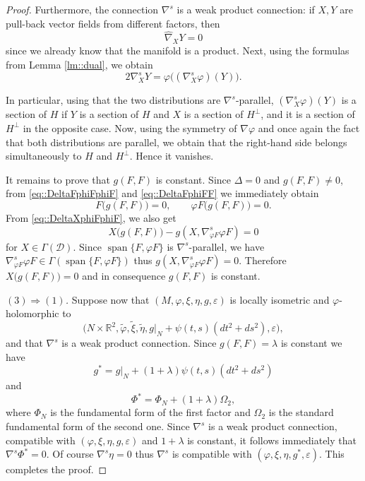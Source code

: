 \documentclass[12pt,a4paper,final]{amsart}
\numberwithin{equation}{section}
\theoremstyle{df}
\newcommand{\R}{\mathbb{R}}
\newcommand{\Span}{\operatorname{span}}
\newcommand{\eps}{\varepsilon}
\begin{document}
\begin{proof}
\par

 Furthermore,  the connection $\nabla^s$ is a weak product
connection: if $X,Y$ are pull-back vector fields  from different
factors, then
\[
\widehat{\nabla}_XY=0
\]
since we already know that the manifold is a product.
Next, using the formulas from Lemma \ref{lm::dual}, we obtain
\[
2\nabla^s_XY=\varphi\bigl((\nabla^s_X\varphi)(Y)\bigr).
\]

In particular, using that the two distributions are $\nabla^s$-parallel, $(\nabla^s_X\varphi)(Y)$ is a section of $H$ if $Y$ is a section of
$H$ and $X$ is a section of $H^\perp$, and it is a section of $H^\perp$
in the opposite case.
Now, using the symmetry of $\nabla\varphi$ and once again the fact that both
distributions are parallel, we obtain that the right-hand side belongs
simultaneously to $H$ and $H^\perp$. Hence it vanishes.

\par It remains to prove that $g(F,F)$ is constant. Since $\Delta=0$ and
$g(F,F)\neq 0$, from \eqref{eq::DeltaFphiFphiF} and \eqref{eq::DeltaFphiFF}
we immediately obtain
$$
F\bigl(g(F,F)\bigr)=0,\qquad\varphi F\bigl(g(F,F)\bigr)=0.
$$
From \eqref{eq::DeltaXphiFphiF}, we also get
$$
X\bigl(g(F,F)\bigr)-g(X,\nabla^s_{\varphi F}\varphi F)=0
$$
for $X\in\Gamma(\mathcal D)$.
Since $\Span\{F,\varphi F\}$ is $\nabla^s$-parallel, we have
$\nabla^s_{\varphi F}\varphi F\in\Gamma(\Span\{F,\varphi F\})$
thus $g(X,\nabla^s_{\varphi F}\varphi F)=0$.
Therefore $X\bigl(g(F,F)\bigr)=0$ and in consequence $g(F,F)$ is constant.

\medskip

\noindent\emph{$(3)\Rightarrow(1)$.}
Suppose now that $(M,\varphi,\xi,\eta,g,\eps)$ is locally isometric and
$\varphi$-holomorphic to
$$
\bigl(N\times \R^2,\widetilde\varphi,\widetilde\xi,\widetilde\eta,
g|_N+\psi(t,s)(dt^2+ds^2),\eps\bigr),
$$
and that $\nabla^s$ is a weak product connection. Since $g(F,F)=\lambda$ is
constant we have
$$
g^\ast=g|_N+(1+\lambda)\psi(t,s)(dt^2+ds^2)
$$
and
$$
\Phi^\ast=\Phi_N+(1+\lambda)\Omega_2,
$$
where $\Phi_N$ is the fundamental form of the first factor and $\Omega_2$ is
the standard fundamental form of the second one. Since $\nabla^s$ is a weak  product
connection, compatible with $(\varphi,\xi,\eta,g,\eps)$ and $1+\lambda$ is
constant, it follows immediately that $\nabla^s\Phi^\ast=0$. Of course $\nabla^s\eta=0$ thus
$\nabla^s$ is compatible with $(\varphi,\xi,\eta,g^\ast,\eps)$.
This completes the proof.
\end{proof}
\end{document}
